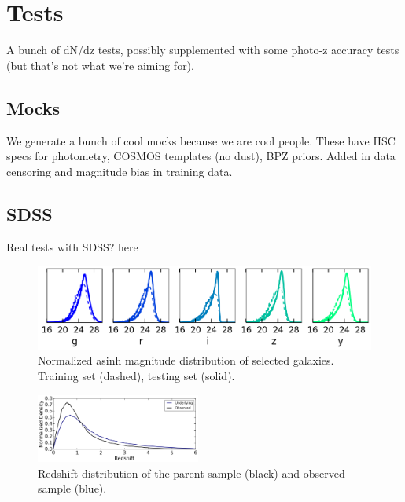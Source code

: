\documentclass[a4paper,fleqn,usenatbib,english]{mnras}
\begin{document}

\section{Tests}
\label{sec:tests}

A bunch of dN/dz tests, possibly supplemented with some photo-z accuracy tests (but that's not what we're aiming for).


\subsection{Mocks}
\label{subsec:mocks}

We generate a bunch of cool mocks because we are cool people. These have HSC specs for photometry,  COSMOS templates (no dust), BPZ priors. Added in data censoring and magnitude bias in training data.

\subsection{SDSS}
\label{subsec:sdss}

Real tests with SDSS? here

\begin{figure}
\begin{center}
\includegraphics[width=\textwidth]{mag_dist_sel.png}
\end{center}
\caption{Normalized asinh magnitude distribution of selected galaxies. Training set (dashed), testing set (solid).
}\label{fig:mag}
\end{figure}

\begin{figure}
\begin{center}
\includegraphics[width=0.48\textwidth]{z_dist.png}
\end{center}
\caption{Redshift distribution of the parent sample (black) and observed sample (blue).
}\label{fig:redshift}
\end{figure}
\end{document}
